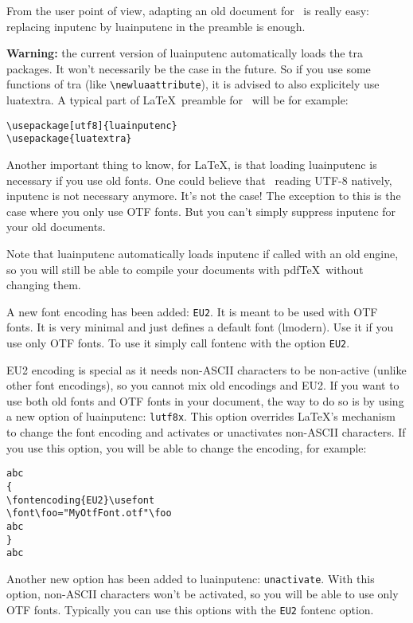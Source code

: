\documentclass{article}
\newcommand\pf{\textsf}
\newcommand\code{\texttt}
\begin{document}
From the user point of view, adapting an old document for \LuaTeX\ is really
easy: replacing \pf{inputenc} by \pf{luainputenc} in the preamble is
enough.

\textbf{Warning:} the current version of \pf{luainputenc} automatically
loads the \LuaTeX tra packages. It won't necessarily be the case in the
future. So if you use some functions of \LuaTeX tra (like
\verb+\newluaattribute+), it is advised to also explicitely use
\pf{luatextra}. A typical part of \LaTeX\ preamble for \LuaTeX\ will be
for example:

\begin{verbatim}
\usepackage[utf8]{luainputenc}
\usepackage{luatextra}
\end{verbatim}

Another important thing to know, for \LaTeX , is that loading
\pf{luainputenc} is necessary if you use old fonts. One could believe that
\LuaTeX\ reading UTF-8 natively, \pf{inputenc} is not necessary anymore.
It's not the case! The exception to this is the case where you only use OTF
fonts. But you can't simply suppress \pf{inputenc} for your old documents.

Note that \pf{luainputenc} automatically loads \pf{inputenc} if called
with an old engine, so you will still be able to compile your documents with
pdf\TeX\ without changing them.

A new font encoding has been added: \code{EU2}. It is meant to be used with
OTF fonts. It is very minimal and just defines a default font (lmodern). Use
it if you use only OTF fonts. To use it simply call \pf{fontenc} with the
option \code{EU2}.

EU2 encoding is special as it needs non-ASCII characters to be non-active
(unlike other font encodings), so you cannot mix old encodings and EU2. If you
want to use both old fonts and OTF fonts in your document, the way to do so is
by using a new option of \pf{luainputenc}: \code{lutf8x}. This option
overrides \LaTeX 's mechanism to change the font encoding and activates or
unactivates non-ASCII characters. If you use this option, you will be able to
change the encoding, for example:

\begin{verbatim}
abc
{
\fontencoding{EU2}\usefont
\font\foo="MyOtfFont.otf"\foo
abc
}
abc
\end{verbatim}

Another new option has been added to \pf{luainputenc}:
\code{unactivate}. With this option, non-ASCII characters won't be
activated, so you will be able to use only OTF fonts. Typically you can use
this options with the \code{EU2} \pf{fontenc} option.
\end{document}
